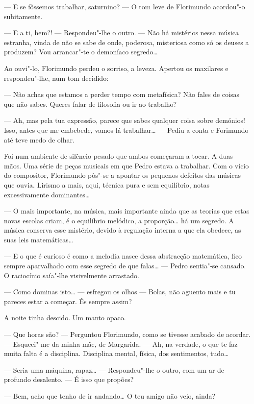 --- E se fôssemos trabalhar, saturnino? --- O tom leve de Florimundo
acordou"-o subitamente.

--- E a ti, hem?! --- Respondeu"-lhe o outro. --- Não há mistérios nessa música
estranha, vinda de não se sabe de onde, poderosa, misteriosa como só os
deuses a produzem? Vou arrancar"-te o demoníaco segredo\ldots{}

Ao ouvi"-lo, Florimundo perdeu o sorriso, a leveza. Apertou os maxilares
e respondeu"-lhe, num tom decidido:

--- Não achas que estamos a perder tempo com metafísica? Não fales de
coisas que não sabes. Queres falar de filosofia ou ir ao trabalho?

--- Ah, mas pela tua expressão, parece que sabes qualquer coisa sobre
demónios! Isso, antes que me embebede, vamos lá trabalhar\ldots{} ---
Pediu a conta e Forimundo até teve medo de olhar.

Foi num ambiente de silêncio pesado que ambos começaram a tocar. A duas
mãos. Uma série de peças musicais em que Pedro estava a trabalhar. Com o
vício do compositor, Florimundo pôs"-se a apontar os pequenos defeitos
das músicas que ouvia. Lirismo a mais, aqui, técnica pura e sem
equilíbrio, notas excessivamente dominantes\ldots{}

--- O mais importante, na música, mais importante ainda que as teorias que
estas novas escolas criam, é o equilíbrio melódico, a proporção\ldots{} há um
segredo. A música conserva esse mistério, devido à regulação interna a
que ela obedece, as suas leis matemáticas\ldots{}

--- E o que é curioso é como a melodia nasce dessa abstracção matemática,
fico sempre aparvalhado com esse segredo de que falas\ldots{} --- Pedro
sentia"-se cansado. O raciocínio saía"-lhe visivelmente arrastado.

--- Como dominas isto\ldots{} --- esfregou os olhos --- Bolas, não aguento mais e tu
pareces estar a começar. És sempre assim?

A noite tinha descido. Um manto opaco.

--- Que horas são? --- Perguntou Florimundo, como se tivesse acabado de
acordar. --- Esqueci"-me da minha mãe, de Margarida. --- Ah, na verdade, o
que te faz muita falta é a disciplina. Disciplina mental, física, dos
sentimentos, tudo\ldots{}

--- Seria uma máquina, rapaz\ldots{} --- Respondeu"-lhe o outro, com um ar de
profundo desalento. --- É isso que propões?

--- Bem, acho que tenho de ir andando\ldots{} O teu amigo não veio, ainda?

